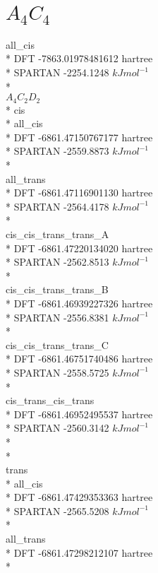 \documentclass{article}
\begin{document}
\section{\(A_{4}C_{4}\)}
    all\_cis\\*
    DFT     -7863.01978481612 hartree\\*
    SPARTAN -2254.1248 \(kJmol^{-1}\)\\*\\
\(A_{4}C_{2}D_{2}\)\\*
    cis\\*
    all\_cis\\*
    DFT  -6861.47150767177 hartree\\*
    SPARTAN -2559.8873 \(kJmol^{-1}\)\\*\\
    all\_trans\\*
    DFT -6861.47116901130 hartree\\*
    SPARTAN -2564.4178 \(kJmol^{-1}\)\\*\\
    cis\_cis\_trans\_trans\_A\\*
    DFT -6861.47220134020 hartree\\*
    SPARTAN -2562.8513 \(kJmol^{-1}\)\\*\\
    cis\_cis\_trans\_trans\_B\\*
    DFT  -6861.46939227326 hartree\\*
    SPARTAN -2556.8381 \(kJmol^{-1}\)\\*\\
    cis\_cis\_trans\_trans\_C\\*
    DFT -6861.46751740486 hartree\\*
    SPARTAN -2558.5725 \(kJmol^{-1}\)\\*\\
    cis\_trans\_cis\_trans\\*
    DFT -6861.46952495537 hartree\\*
    SPARTAN -2560.3142 \(kJmol^{-1}\)\\*\\*\\
    trans\\*
    all\_cis\\*
    DFT -6861.47429353363 hartree\\*
    SPARTAN -2565.5208 \(kJmol^{-1}\)\\*\\
    all\_trans\\*
    DFT -6861.47298212107 hartree\\*
\end{document}
